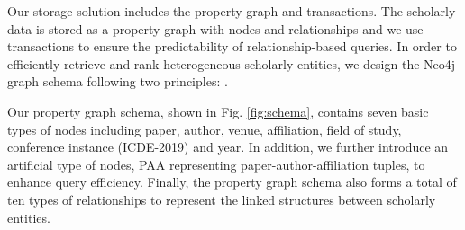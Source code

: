 
Our storage solution includes the property graph and transactions. The scholarly data is stored as a property graph with nodes and relationships and we use transactions to ensure the predictability of relationship-based queries. 
In order to efficiently retrieve and rank heterogeneous scholarly entities, we design the Neo4j graph schema following two principles: .

Our property graph schema, shown in Fig. \ref{fig:schema}, contains seven basic types of nodes including paper, author, venue, affiliation, field of study, conference instance (\eg ICDE-2019) and year. In addition, we further introduce an artificial type of nodes, \ie PAA representing paper-author-affiliation tuples, to enhance query efficiency. Finally, the property graph schema also forms a total of ten types of relationships to represent the linked structures between scholarly entities.




